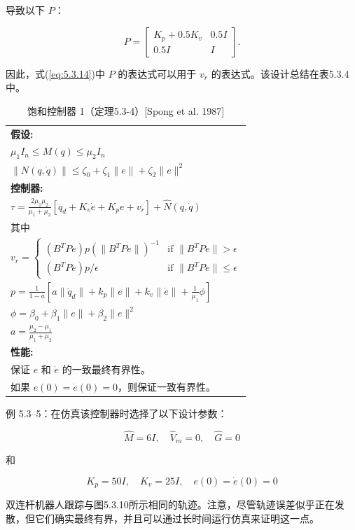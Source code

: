 \documentclass[UTF8,12pt,a4paper]{ctexart}
\begin{document}
导致以下 $P$：

\begin{equation}\label{eq:5.3.14}
P = \begin{bmatrix} K_p + 0.5K_v & 0.5I \\ 0.5I & I \end{bmatrix}.
\end{equation}

因此，式(\ref{eq:5.3.14})中 $P$ 的表达式可以用于 $v_r$ 的表达式。该设计总结在表5.3.4中。

\begin{table}[htbp]
\centering
\caption{饱和控制器 1（定理5.3-4）[Spong et al. 1987]}
\label{tab:5.3.4}
\begin{tabular}{@{}l@{}}
\toprule
\textbf{假设:} \\[0.5em]
\quad $\displaystyle \mu_1 I_n \leq M(q) \leq \mu_2 I_n$ \\[0.5em]
\quad $\displaystyle \|N(q, \dot{q})\| \leq \zeta_0 + \zeta_1\|e\| + \zeta_2\|e\|^2$ \\[1em]
\midrule
\textbf{控制器:} \\[0.5em]
\quad $\displaystyle \tau = \frac{2\mu_1\mu_2}{\mu_1+\mu_2}[\ddot{q}_d + K_v\dot{e} + K_p e + v_r] + \hat{N}(q, \dot{q})$ \\[1em]
\quad 其中 \\[0.5em]
\quad $\displaystyle v_r = \begin{cases} (B^T P e)p(\|B^T P e\|)^{-1} & \text{if } \|B^T P e\| > \epsilon \\ (B^T P e)p/\epsilon & \text{if } \|B^T P e\| \leq \epsilon \end{cases}$ \\[0.8em]
\quad $\displaystyle p = \frac{1}{1-a}\left[a\|\ddot{q}_d\| + k_p\|e\| + k_v\|\dot{e}\| + \frac{1}{\mu_1}\phi\right]$ \\[0.5em]
\quad $\displaystyle \phi = \beta_0 + \beta_1\|e\| + \beta_2\|e\|^2$ \\[0.5em]
\quad $\displaystyle a = \frac{\mu_2-\mu_1}{\mu_1+\mu_2}$ \\[1em]
\midrule
\textbf{性能:} \\
\quad 保证 $e$ 和 $\dot{e}$ 的一致最终有界性。 \\
\quad 如果 $e(0) = \dot{e}(0) = 0$，则保证一致有界性。 \\
\bottomrule
\end{tabular}
\end{table}

\begin{example}[饱和控制器 1]
例 5.3--5：在仿真该控制器时选择了以下设计参数：

\begin{equation*}
\hat{M} = 6I, \quad \hat{V}_m = 0, \quad \hat{G} = 0
\end{equation*}

和

\begin{equation*}
K_p = 50I, \quad K_v = 25I, \quad e(0) = \dot{e}(0) = 0
\end{equation*}

双连杆机器人跟踪与图5.3.10所示相同的轨迹。注意，尽管轨迹误差似乎正在发散，但它们确实最终有界，并且可以通过长时间运行仿真来证明这一点。
\end{example}
\end{document}
